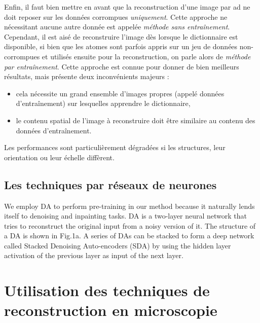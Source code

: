 Enfin, il faut bien mettre en avant que la reconstruction d'une image par \gls{ad} ne doit reposer sur les données corrompues \emph{uniquement}. Cette approche ne nécessitant aucune autre donnée est appelée \emph{méthode sans entraînement}. Cependant, il est aisé de reconstruire l'image dès lorsque le dictionnaire est disponible, si bien que les atomes sont parfois appris sur un jeu de données non-corrompues et utilisés ensuite pour la reconstruction, on parle alors de \emph{méthode par entraînement}. Cette approche est connue pour donner de bien meilleurs résultats, mais présente deux inconvénients majeurs :
\begin{itemize}
    \item cela nécessite un grand ensemble d'images propres (appelé données d'entraînement) sur lesquelles apprendre le dictionnaire,
    \item le contenu spatial de l'image à reconstruire doit être similaire au contenu des données d'entraînement.
\end{itemize}
Les performances sont particulièrement dégradées si les structures, leur orientation ou leur échelle diffèrent.


\subsection{Les techniques par réseaux de neurones}

We employ DA to perform pre-training in our method because it naturally lends itself to denoising
and inpainting tasks. DA is a two-layer neural network that tries to reconstruct the original input
from a noisy version of it. The structure of a DA is shown in Fig.1a. A series of DAs can be stacked
to form a deep network called Stacked Denoising Auto-encoders (SDA) by using the hidden layer
activation of the previous layer as input of the next layer.








%
\section{Utilisation des techniques de reconstruction en microscopie}\label{sec-art-micro}

